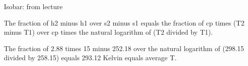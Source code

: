 Isobar: from lecture

The fraction of h2 minus h1 over s2 minus s1 equals the fraction of cp times (T2 minus T1) over cp times the natural logarithm of (T2 divided by T1).

The fraction of 2.88 times 15 minus 252.18 over the natural logarithm of (298.15 divided by 258.15) equals 293.12 Kelvin equals average T.